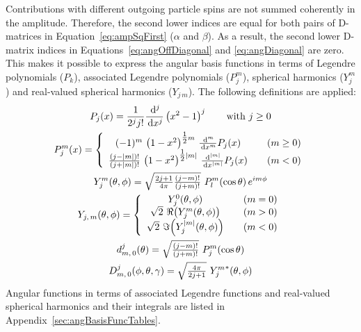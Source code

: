 Contributions with different outgoing particle spins are not summed coherently in the amplitude.
Therefore, the second lower indices are equal for both pairs of D-matrices in
Equation~\ref{eq:ampSqFirst} ($\alpha$ and $\beta$). As a result, the second lower D-matrix indices
in Equations~\ref{eq:angOffDiagonal} and \ref{eq:angDiagonal} are zero. This makes it possible to
express the angular basis functions in terms of Legendre polynomials ($P_k$), associated Legendre
polynomials ($P_j^m$), spherical harmonics ($Y_j^m$) and real-valued spherical harmonics
($Y_{j\,m}$). The following definitions are applied:
\begin{subequations}\label{eq:PYDDefinitions}\begin{gather}
  P_j(x) = \frac{1}{2^j j!} \frac{\ud^j}{\ud x^j} \left(x^2-1\right)^j
    \qquad \text{with } j\ge0 \\
  P_j^m(x) = \left\{\begin{array}{cl}
    (-1)^m\,\left(1-x^2\right)^{\tfrac{1}{2}m}\,\frac{\ud^m}{\ud x^m}P_j(x)
      &\quad(m\ge0) \\
    \tfrac{(j-|m|)!}{(j+|m|)!}\,\left(1-x^2\right)^{\tfrac{1}{2}|m|}\,
      \frac{\ud^{|m|}}{\ud x^{|m|}}P_j(x)
      &\quad(m<0)
   \end{array}\right.\\
  Y_j^m(\theta,\phi) = \sqrt{\tfrac{2j+1}{4\pi}\tfrac{(j-m)!}{(j+m)!}}\
    P_l^m(\cos\theta)\, e^{im\phi} \\
  Y_{j,\,m}(\theta,\phi) = \left\{\begin{array}{cl}
     Y_j^0(\theta,\phi)
       &\quad(m=0) \\
     \sqrt{2}\ \Re\!\left(Y_j^m(\theta,\phi)\right)
       &\quad(m>0) \\
     \sqrt{2}\ \Im\!\left(Y_j^{|m|}(\theta,\phi)\right)
       &\quad(m<0)
   \end{array}\right. \\
  d_{m,\,0}^j(\theta) = \sqrt{\tfrac{(j-m)!}{(j+m)!}}\ P_j^m(\cos\theta) \\
  D_{m,\,0}^j(\phi,\theta,\gamma) = \sqrt{\tfrac{4\pi}{2j+1}}\ {Y_j^m}^*(\theta,\phi)
\end{gather}\end{subequations}
Angular functions in terms of associated Legendre functions and real-valued spherical harmonics and
their integrals are listed in Appendix~\ref{sec:angBasisFuncTables}. 

